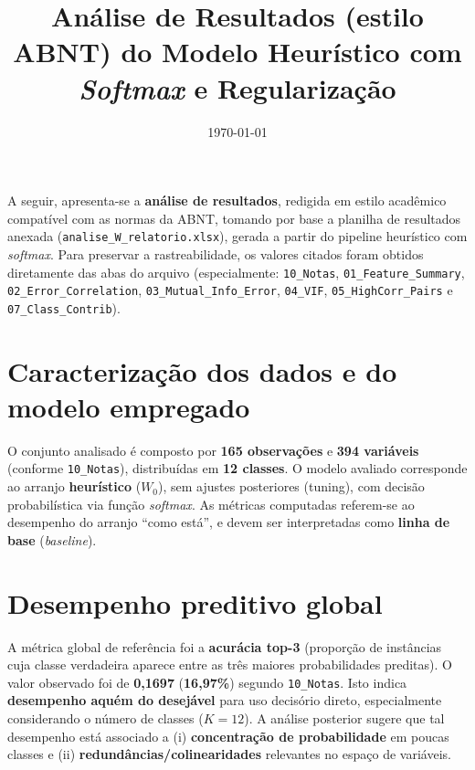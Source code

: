 \documentclass[12pt,a4paper]{article}
\title{Análise de Resultados (estilo ABNT) do Modelo Heurístico com \textit{Softmax} e Regularização}
\author{}
\date{\today}
\begin{document}
\maketitle

\noindent
A seguir, apresenta-se a \textbf{análise de resultados}, redigida em estilo acadêmico compatível com as normas da ABNT, tomando por base a planilha de resultados anexada (\texttt{analise\_W\_relatorio.xlsx}), gerada a partir do pipeline heurístico com \textit{softmax}. Para preservar a rastreabilidade, os valores citados foram obtidos diretamente das abas do arquivo (especialmente: \texttt{10\_Notas}, \texttt{01\_Feature\_Summary}, \texttt{02\_Error\_Correlation}, \texttt{03\_Mutual\_Info\_Error}, \texttt{04\_VIF}, \texttt{05\_HighCorr\_Pairs} e \texttt{07\_Class\_Contrib}).

\section{Caracterização dos dados e do modelo empregado}
O conjunto analisado é composto por \textbf{165 observações} e \textbf{394 variáveis} (conforme \texttt{10\_Notas}), distribuídas em \textbf{12 classes}. O modelo avaliado corresponde ao arranjo \textbf{heurístico} ($W_0$), sem ajustes posteriores (tuning), com decisão probabilística via função \textit{softmax}. As métricas computadas referem-se ao desempenho do arranjo ``como está'', e devem ser interpretadas como \textbf{linha de base} (\textit{baseline}).

\section{Desempenho preditivo global}
A métrica global de referência foi a \textbf{acurácia top-3} (proporção de instâncias cuja classe verdadeira aparece entre as três maiores probabilidades preditas). O valor observado foi de \textbf{0{,}1697} (\textbf{16{,}97\%}) segundo \texttt{10\_Notas}. Isto indica \textbf{desempenho aquém do desejável} para uso decisório direto, especialmente considerando o número de classes ($K=12$). A análise posterior sugere que tal desempenho está associado a (i) \textbf{concentração de probabilidade} em poucas classes e (ii) \textbf{redundâncias/colinearidades} relevantes no espaço de variáveis.
\end{document}
